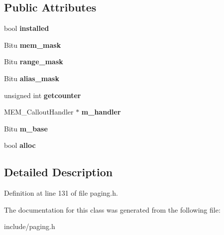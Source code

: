 \subsection*{Public Attributes}
\begin{DoxyCompactItemize}
\item 
\hypertarget{classMEM__CalloutObject_a7b541b8ebca7dc3f4d270ed3b452e728}{bool {\bfseries installed}}\label{classMEM__CalloutObject_a7b541b8ebca7dc3f4d270ed3b452e728}

\item 
\hypertarget{classMEM__CalloutObject_a4e9e808b42695910067942ba96910a4a}{Bitu {\bfseries mem\-\_\-mask}}\label{classMEM__CalloutObject_a4e9e808b42695910067942ba96910a4a}

\item 
\hypertarget{classMEM__CalloutObject_abf0675214f67f07ed55398b4f3134c52}{Bitu {\bfseries range\-\_\-mask}}\label{classMEM__CalloutObject_abf0675214f67f07ed55398b4f3134c52}

\item 
\hypertarget{classMEM__CalloutObject_a9943a9b012fbe4062165212e82eb9a40}{Bitu {\bfseries alias\-\_\-mask}}\label{classMEM__CalloutObject_a9943a9b012fbe4062165212e82eb9a40}

\item 
\hypertarget{classMEM__CalloutObject_a7c878c0fd1220ff368d99f711ddfc72b}{unsigned int {\bfseries getcounter}}\label{classMEM__CalloutObject_a7c878c0fd1220ff368d99f711ddfc72b}

\item 
\hypertarget{classMEM__CalloutObject_a3c74b9fe23f7c0c1f2509af29527fc02}{M\-E\-M\-\_\-\-Callout\-Handler $\ast$ {\bfseries m\-\_\-handler}}\label{classMEM__CalloutObject_a3c74b9fe23f7c0c1f2509af29527fc02}

\item 
\hypertarget{classMEM__CalloutObject_ac31010e57ee064b986e747a978bdb093}{Bitu {\bfseries m\-\_\-base}}\label{classMEM__CalloutObject_ac31010e57ee064b986e747a978bdb093}

\item 
\hypertarget{classMEM__CalloutObject_ab0bd7d892bbbe4ae49e5a0e40812fc61}{bool {\bfseries alloc}}\label{classMEM__CalloutObject_ab0bd7d892bbbe4ae49e5a0e40812fc61}

\end{DoxyCompactItemize}


\subsection{Detailed Description}


Definition at line 131 of file paging.\-h.



The documentation for this class was generated from the following file\-:\begin{DoxyCompactItemize}
\item 
include/paging.\-h\end{DoxyCompactItemize}
